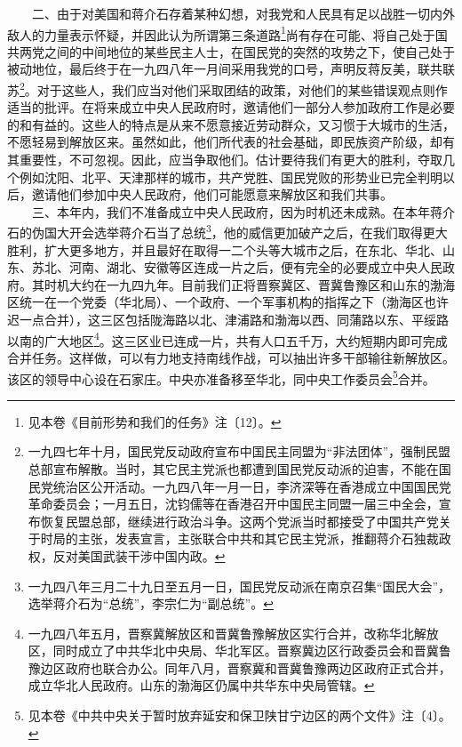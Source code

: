 \documentclass[cn,11pt,chinese]{elegantbook}
\begin{document}
　　二、由于对美国和蒋介石存着某种幻想，对我党和人民具有足以战胜一切内外敌人的力量表示怀疑，并因此认为所谓第三条道路\footnote[1]{ 见本卷《目前形势和我们的任务》注〔12〕。}尚有存在可能、将自己处于国共两党之间的中间地位的某些民主人士，在国民党的突然的攻势之下，使自己处于被动地位，最后终于在一九四八年一月间采用我党的口号，声明反蒋反美，联共联苏\footnote[2]{ 一九四七年十月，国民党反动政府宣布中国民主同盟为“非法团体”，强制民盟总部宣布解散。当时，其它民主党派也都遭到国民党反动派的迫害，不能在国民党统治区公开活动。一九四八年一月一日，李济深等在香港成立中国国民党革命委员会；一月五日，沈钧儒等在香港召开中国民主同盟一届三中全会，宣布恢复民盟总部，继续进行政治斗争。这两个党派当时都接受了中国共产党关于时局的主张，发表宣言，主张联合中共和其它民主党派，推翻蒋介石独裁政权，反对美国武装干涉中国内政。}。对于这些人，我们应当对他们采取团结的政策，对他们的某些错误观点则作适当的批评。在将来成立中央人民政府时，邀请他们一部分人参加政府工作是必要的和有益的。这些人的特点是从来不愿意接近劳动群众，又习惯于大城市的生活，不愿轻易到解放区来。虽然如此，他们所代表的社会基础，即民族资产阶级，却有其重要性，不可忽视。因此，应当争取他们。估计要待我们有更大的胜利，夺取几个例如沈阳、北平、天津那样的城市，共产党胜、国民党败的形势业已完全判明以后，邀请他们参加中央人民政府，他们可能愿意来解放区和我们共事。\\
　　三、本年内，我们不准备成立中央人民政府，因为时机还未成熟。在本年蒋介石的伪国大开会选举蒋介石当了总统\footnote[3]{ 一九四八年三月二十九日至五月一日，国民党反动派在南京召集“国民大会”，选举蒋介石为“总统”，李宗仁为“副总统”。}，他的威信更加破产之后，在我们取得更大胜利，扩大更多地方，并且最好在取得一二个头等大城市之后，在东北、华北、山东、苏北、河南、湖北、安徽等区连成一片之后，便有完全的必要成立中央人民政府。其时机大约在一九四九年。目前我们正将晋察冀区、晋冀鲁豫区和山东的渤海区统一在一个党委（华北局）、一个政府、一个军事机构的指挥之下（渤海区也许迟一点合并），这三区包括陇海路以北、津浦路和渤海以西、同蒲路以东、平绥路以南的广大地区\footnote[4]{ 一九四八年五月，晋察冀解放区和晋冀鲁豫解放区实行合并，改称华北解放区，同时成立了中共华北中央局、华北军区。晋察冀边区行政委员会和晋冀鲁豫边区政府也联合办公。同年八月，晋察冀和晋冀鲁豫两边区政府正式合并，成立华北人民政府。山东的渤海区仍属中共华东中央局管辖。}。这三区业已连成一片，共有人口五千万，大约短期内即可完成合并任务。这样做，可以有力地支持南线作战，可以抽出许多干部输往新解放区。该区的领导中心设在石家庄。中央亦准备移至华北，同中央工作委员会\footnote[5]{ 见本卷《中共中央关于暂时放弃延安和保卫陕甘宁边区的两个文件》注〔4〕。}合并。\\
\end{document}
